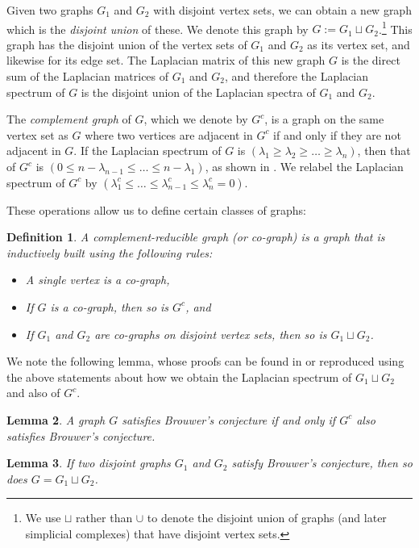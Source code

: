\documentclass[11pt]{article}
\newtheorem{lm}{Lemma}
\newtheorem{defi}[lm]{Definition}
\begin{document}
Given two graphs $G_1$ and $G_2$ with disjoint vertex sets, we can obtain a new graph which is the \emph{disjoint union} of these. We denote this graph by $G := G_1 \sqcup G_2$.\footnote{We use $\sqcup$ rather than $\cup$ to denote the disjoint union of graphs (and later simplicial complexes) that have disjoint vertex sets.} This graph has the disjoint union of the vertex sets of $G_1$ and $G_2$ as its vertex set, and likewise for its edge set. The Laplacian matrix of this new graph $G$ is the direct sum of the Laplacian matrices of $G_1$ and $G_2$, and therefore the Laplacian spectrum of $G$ is the disjoint union of the Laplacian spectra of $G_1$ and $G_2$.

The \emph{complement graph} of $G$, which we denote by $G^c$, is a graph on the same vertex set as $G$ where two vertices are adjacent in $G^c$ if and only if they are not adjacent in $G$. If the Laplacian spectrum of $G$ is $\left( \lambda_1 \geq \lambda_2 \geq \ldots \geq \lambda_n \right)$, then that of $G^c$ is $\left( 0 \leq n-\lambda_{n-1} \leq \ldots \leq n-\lambda_1\right)$, as shown in \cite{BH}. We relabel the Laplacian spectrum of $G^c$ by $\left( \lambda_1^c \leq \ldots \leq \lambda_{n-1}^c \leq \lambda_n^c=0\right)$.

These operations allow us to define certain classes of graphs:

\begin{defi}
A \emph{complement-reducible graph} (or co-graph) is a graph that is inductively built using the following rules:
\begin{itemize}
\item A single vertex is a co-graph,
\item If $G$ is a co-graph, then so is $G^c$, and
\item If $G_1$ and $G_2$ are co-graphs on disjoint vertex sets, then so is $G_1 \sqcup G_2$.
\end{itemize}
\end{defi}


We note the following lemma, whose proofs can be found in \cite{M} or reproduced using the above statements about how we obtain the Laplacian spectrum of $G_1 \sqcup G_2$ and also of $G^c$.

\begin{lm}
\label{comp}
A graph $G$ satisfies Brouwer's conjecture if and only if $G^c$ also satisfies Brouwer's conjecture.
\end{lm}

\begin{lm}
\label{disjoint}
If two disjoint graphs $G_1$ and $G_2$ satisfy Brouwer's conjecture, then so does $G = G_1 \sqcup G_2$.
\end{lm}
\end{document}
